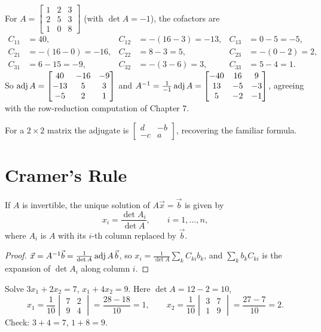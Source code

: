\begin{example}
For $A=\begin{bmatrix}1&2&3\\2&5&3\\1&0&8\end{bmatrix}$ (with $\det A=-1$), the cofactors are
\[
\begin{aligned}
C_{11}&=40, & C_{12}&=-(16-3)=-13, & C_{13}&=0-5=-5,\\
C_{21}&=-(16-0)=-16, & C_{22}&=8-3=5, & C_{23}&=-(0-2)=2,\\
C_{31}&=6-15=-9, & C_{32}&=-(3-6)=3, & C_{33}&=5-4=1.
\end{aligned}
\]
So $\operatorname{adj} A=\begin{bmatrix}40&-16&-9\\-13&5&3\\-5&2&1\end{bmatrix}$ and
$A^{-1}=\frac{1}{-1}\operatorname{adj} A=\begin{bmatrix}-40&16&9\\13&-5&-3\\5&-2&-1\end{bmatrix}$, agreeing with the
row-reduction computation of Chapter 7.
\end{example}

For a $2\times2$ matrix the adjugate is $\begin{bmatrix}d&-b\\-c&a\end{bmatrix}$, recovering the familiar formula.

\section{Cramer's Rule}

\begin{theorem}
If $A$ is invertible, the unique solution of $A\vec x=\vec b$ is given by
\[
  x_i=\frac{\det A_i}{\det A},\qquad i=1,\dots,n,
\]
where $A_i$ is $A$ with its $i$-th column replaced by $\vec b$.
\end{theorem}
\begin{proof}
$\vec x=A^{-1}\vec b=\frac{1}{\det A}\operatorname{adj} A\,\vec b$, so
$x_i=\frac{1}{\det A}\sum_k C_{ki}b_k$, and $\sum_kb_kC_{ki}$ is the expansion of $\det A_i$ along column $i$.
\end{proof}

\begin{example}
Solve $3x_1+2x_2=7$, $x_1+4x_2=9$. Here $\det A=12-2=10$,
\[
x_1=\frac{1}{10}\begin{vmatrix}7&2\\9&4\end{vmatrix}=\frac{28-18}{10}=1,\qquad
x_2=\frac{1}{10}\begin{vmatrix}3&7\\1&9\end{vmatrix}=\frac{27-7}{10}=2.
\]
Check: $3+4=7$, $1+8=9$.
\end{example}

